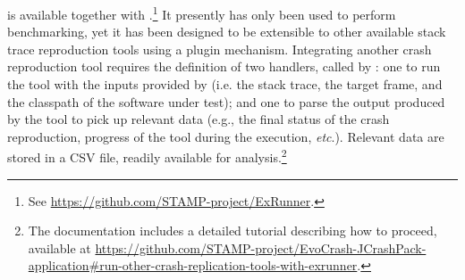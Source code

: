 \exrunner is available together with \crashpack.\footnote{See \url{https://github.com/STAMP-project/ExRunner}.}
It presently has only been used to perform \evocrash benchmarking, yet it has been designed to be extensible to other available stack trace reproduction tools using a plugin mechanism. 
Integrating another crash reproduction tool requires the definition of two handlers, called by \exrunner: one to run the tool with the inputs provided by \exrunner (i.e. the stack trace, the target frame, and the classpath of the software under test); and one to parse the output produced by the tool to pick up relevant data (e.g., the final status of the crash reproduction, progress of the tool during the execution, \textit{etc}.). 
Relevant data are stored in a CSV file, readily available for analysis.\footnote{ The \exrunner documentation includes a detailed tutorial describing how to proceed, available at \url{https://github.com/STAMP-project/EvoCrash-JCrashPack-application\#run-other-crash-replication-tools-with-exrunner}.}

